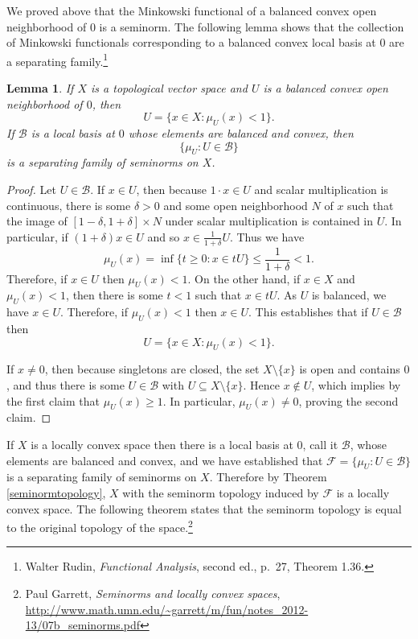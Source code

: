 \documentclass{article}
\newtheorem{lemma}[theorem]{Lemma}
\begin{document}
We  proved above that the Minkowski functional of a balanced convex open neighborhood of $0$ is a seminorm. 
The following lemma shows  that the collection of Minkowski functionals corresponding to a balanced convex local basis at $0$ are a separating family.\footnote{Walter Rudin, {\em Functional Analysis}, second ed., p.~27, Theorem 1.36.}

\begin{lemma}
If $X$ is a topological vector space and $U$ is a balanced convex open neighborhood of $0$, then 
\[
U = \{x \in X: \mu_U(x)<1\}.
\]
If  $\mathscr{B}$ is a local basis at $0$ whose elements are balanced and convex, then
\[
\{\mu_U: U \in \mathscr{B}\}
\]
 is a separating family of seminorms on $X$.
 \label{minkowski}
\end{lemma}
\begin{proof}
Let $U \in \mathscr{B}$.  If $x \in U$, then
because $1 \cdot x \in U$ and scalar multiplication
is continuous, there is some $\delta>0$ and some open neighborhood $N$ of $x$ such that the image of $[1-\delta,1+\delta] \times N$ under scalar multiplication
is contained in $U$. In particular, if $(1+\delta)x \in U$ and so $x \in \frac{1}{1+\delta}U$. 
Thus we have
\[
\mu_U(x)=\inf \{t \geq 0: x \in tU\} \leq \frac{1}{1+\delta}<1.
\]
Therefore, if $x \in U$ then $\mu_U(x)<1$.  On the other hand,
if $x \in X$ and $\mu_U(x)<1$, then there is some $t<1$ such that $x \in tU$. As $U$ is balanced, we have $x \in U$. Therefore,
if $\mu_U(x)<1$ then $x \in U$. This establishes that if $U \in \mathscr{B}$ then
\[
U = \{x \in X: \mu_U(x)<1\}.
\]

If $x \neq 0$, then because singletons are closed, the set $X \setminus \{x\}$ is  open and contains $0$, and thus
there is some $U \in \mathscr{B}$ with $U \subseteq X \setminus \{x\}$.  Hence $x \not \in U$, which implies by the first claim that
 $\mu_U(x) \geq 1$. In particular, $\mu_U(x) \neq 0$, proving the second claim.
\end{proof}

If $X$ is a locally convex space then there is a local basis at $0$, call it $\mathscr{B}$, whose elements are balanced and convex, and we have established that $\mathscr{F}=\{\mu_U:U \in \mathscr{B}\}$ is a separating family of seminorms on $X$. Therefore by Theorem \ref{seminormtopology}, $X$ with the seminorm topology induced by $\mathscr{F}$ 
is a locally convex space. The following theorem states that the seminorm topology is equal to the original topology of the space.\footnote{Paul Garrett, {\em Seminorms and locally convex spaces}, \url{http://www.math.umn.edu/~garrett/m/fun/notes_2012-13/07b_seminorms.pdf}}
\end{document}

